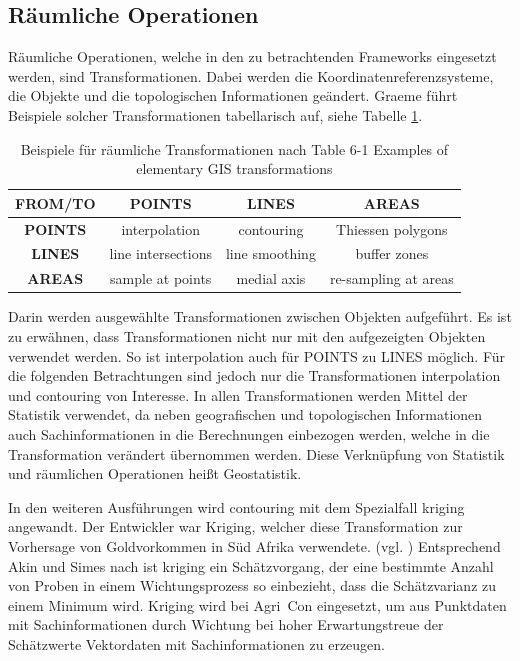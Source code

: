 \subsection{Räumliche Operationen}
Räumliche Operationen, welche in den zu betrachtenden Frameworks eingesetzt werden, sind Transformationen.
Dabei werden die Koordinatenreferenzsysteme, die Objekte und die topologischen Informationen geändert.
Graeme führt Beispiele solcher Transformationen tabellarisch auf, siehe Tabelle  \ref{table:spatialfunctions}.
\begin{table}[h]
\centering
\begin{tabular}{c|c|c|c}
\textbf{FROM/TO} & \textbf{POINTS} & \textbf{LINES} & \textbf{AREAS} \\ \hline
\textbf{POINTS} & interpolation & contouring & Thiessen polygons \\ \hline
\textbf{LINES} & line intersections & line smoothing & buffer zones \\ \hline
\textbf{AREAS} & sample at points & medial axis & re-sampling at areas \\ 
\end{tabular}
\caption[Beispiele für räumliche Transformationen]{Beispiele für räumliche Transformationen nach \cite[S.139]{book:gisforgeoscientists} Table 6-1 Examples of elementary GIS transformations}
\label{table:spatialfunctions}
\end{table}
Darin werden ausgewählte Transformationen zwischen Objekten aufgeführt.
Es ist zu erwähnen, dass Transformationen nicht nur mit den aufgezeigten Objekten verwendet werden.
So ist interpolation auch für POINTS zu LINES möglich.
Für die folgenden Betrachtungen sind jedoch nur die Transformationen interpolation und contouring von Interesse.
In allen Transformationen werden Mittel der Statistik verwendet, da neben geografischen und topologischen Informationen auch Sachinformationen in die Berechnungen einbezogen werden, welche in die Transformation verändert übernommen werden.
Diese Verknüpfung von Statistik und räumlichen Operationen heißt Geostatistik.

In den weiteren Ausführungen wird contouring mit dem Spezialfall kriging angewandt.
Der Entwickler war Kriging, welcher diese Transformation zur Vorhersage von Goldvorkommen in Süd Afrika verwendete. (vgl. \cite[S.317]{book:spatialdataanalysis})
Entsprechend Akin und Simes nach \cite[S.76]{book:verarbeitungspatialdata} ist kriging ein Schätzvorgang, der eine bestimmte Anzahl von Proben in einem Wichtungsprozess so einbezieht, dass die Schätzvarianz zu einem Minimum wird.
Kriging wird bei Agri~Con eingesetzt, um aus Punktdaten mit Sachinformationen durch Wichtung bei hoher Erwartungstreue der Schätzwerte Vektordaten mit Sachinformationen zu erzeugen.

